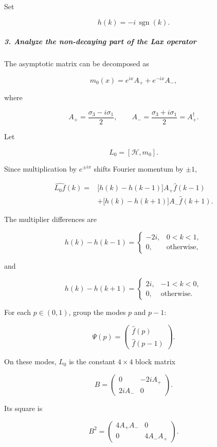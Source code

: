 Set

\[
h(k)=-i\,\operatorname{sgn}(k).
\]

\subparagraph*{3. Analyze the non-decaying part of the Lax operator}

The asymptotic matrix can be decomposed as

\[
m_0(x)=e^{ix}A_+ + e^{-ix}A_-,
\]

where

\[
A_+=\frac{\sigma_3-i\sigma_1}{2}, \qquad A_-=\frac{\sigma_3+i\sigma_1}{2}=A_+^\dagger.
\]

Let

\[
L_0=[\mathcal H,m_0].
\]

Since multiplication by $e^{\pm ix}$ shifts Fourier momentum by $\pm1$,

\[
\begin{aligned}
\widehat{L_0f}(k)
={}&
\bigl[h(k)-h(k-1)\bigr]A_+\widehat f(k-1)
\\
&+
\bigl[h(k)-h(k+1)\bigr]A_-\widehat f(k+1).
\end{aligned}
\]

The multiplier differences are

\[
h(k)-h(k-1)=
\begin{cases}
-2i,&0<k<1,\\
0,&\text{otherwise},
\end{cases}
\]

and

\[
h(k)-h(k+1)=
\begin{cases}
2i,&-1<k<0,\\
0,&\text{otherwise}.
\end{cases}
\]

For each $p\in(0,1)$, group the modes $p$ and $p-1$:

\[
\Psi(p)=
\begin{pmatrix}
\widehat f(p)\\[2mm]
\widehat f(p-1)
\end{pmatrix}.
\]

On these modes, $L_0$ is the constant $4\times4$ block matrix

\[
B=
\begin{pmatrix}
0&-2iA_+\\
2iA_-&0
\end{pmatrix}.
\]

Its square is

\[
B^2=
\begin{pmatrix}
4A_+A_-&0\\
0&4A_-A_+
\end{pmatrix}.
\]

